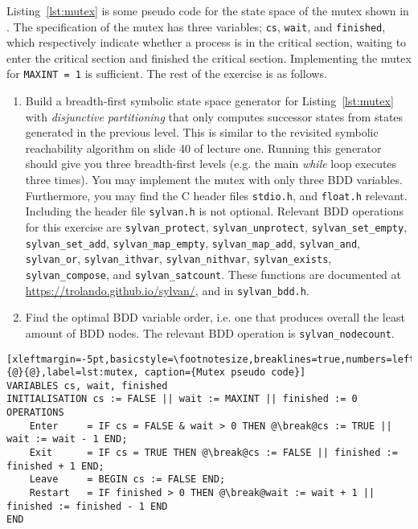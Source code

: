 \documentclass{article}
\begin{document}
Listing~\ref{lst:mutex} is some pseudo code for the state space of the mutex shown in . The specification of the mutex has three variables; \texttt{cs}, \texttt{wait}, and \texttt{finished}, which respectively indicate whether a process is in the critical section, waiting to enter the critical section and finished the critical section. Implementing the mutex for \texttt{MAXINT = 1} is sufficient. The rest of the exercise is as follows.
\begin{enumerate}
    \item Build a breadth-first symbolic state space generator for Listing~\ref{lst:mutex} with \emph{disjunctive partitioning} that only computes successor states from states generated in the previous level. This is similar to the revisited symbolic reachability algorithm on slide 40 of lecture one. Running this generator should give you three breadth-first levels (e.g. the main \emph{while} loop executes three times). You may implement the mutex with only three BDD variables. Furthermore, you may find the C header files \texttt{stdio.h}, and \texttt{float.h} relevant. Including the header file \texttt{sylvan.h} is not optional. Relevant BDD operations for this exercise are \texttt{sylvan\_protect}, \texttt{sylvan\_unprotect}, \texttt{sylvan\_set\_empty}, \texttt{sylvan\_set\_add}, \texttt{sylvan\_map\_empty}, \texttt{sylvan\_map\_add}, \texttt{sylvan\_and}, \texttt{sylvan\_or}, \texttt{sylvan\_ithvar}, \texttt{sylvan\_nithvar}, \texttt{sylvan\_exists}, \texttt{sylvan\_compose}, and \texttt{sylvan\_satcount}. These functions are documented at \url{https://trolando.github.io/sylvan/}, and in \texttt{sylvan\_bdd.h}.
    \item Find the optimal BDD variable order, i.e. one that produces overall the least amount of BDD nodes. The relevant BDD operation is \texttt{sylvan\_nodecount}.
\end{enumerate}

\begin{lstlisting}[xleftmargin=-5pt,basicstyle=\footnotesize,breaklines=true,numbers=left,escapeinside={@}{@},label=lst:mutex, caption={Mutex pseudo code}]
VARIABLES cs, wait, finished
INITIALISATION cs := FALSE || wait := MAXINT || finished := 0
OPERATIONS
    Enter     = IF cs = FALSE & wait > 0 THEN @\break@cs := TRUE || wait := wait - 1 END;
    Exit      = IF cs = TRUE THEN @\break@cs := FALSE || finished := finished + 1 END;
    Leave     = BEGIN cs := FALSE END;
    Restart   = IF finished > 0 THEN @\break@wait := wait + 1 || finished := finished - 1 END
END
\end{lstlisting}
\end{document}
